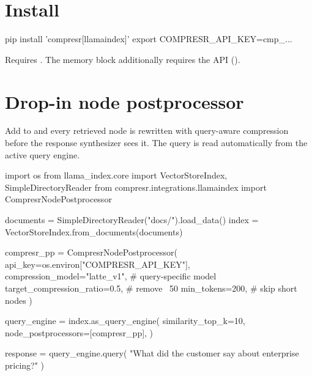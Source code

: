 \documentclass[10pt]{article}
\begin{document}

\section{Install}

\begin{shcode}
pip install 'compresr[llamaindex]'
export COMPRESR_API_KEY=cmp_...
\end{shcode}

Requires . The memory block additionally
requires the  API ().

\section{Drop-in node postprocessor}

Add  to
 and every retrieved node is rewritten
with query-aware compression before the response synthesizer sees it.
The query is read automatically from the active query engine.

\begin{pycode}
import os
from llama_index.core import VectorStoreIndex, SimpleDirectoryReader
from compresr.integrations.llamaindex import CompresrNodePostprocessor

documents = SimpleDirectoryReader("docs/").load_data()
index = VectorStoreIndex.from_documents(documents)

compresr_pp = CompresrNodePostprocessor(
    api_key=os.environ["COMPRESR_API_KEY"],
    compression_model="latte_v1",     # query-specific model
    target_compression_ratio=0.5,     # remove ~50%
    min_tokens=200,                   # skip short nodes
)

query_engine = index.as_query_engine(
    similarity_top_k=10,
    node_postprocessors=[compresr_pp],
)

response = query_engine.query(
    "What did the customer say about enterprise pricing?"
)
\end{pycode}
\end{document}
